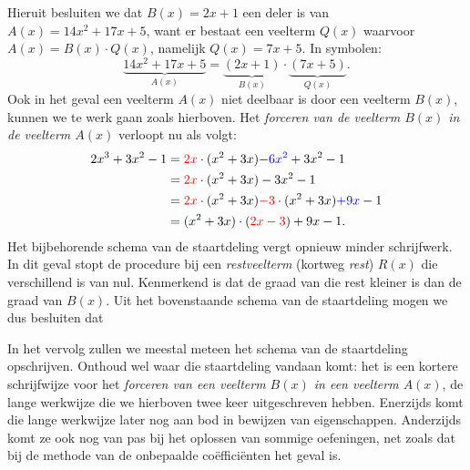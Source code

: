 \documentclass{ximera}
\begin{document}
\begin{werkwijze}
  

Hieruit besluiten we dat $B(x) = 2x+1$ een deler is van $A(x) = 14x^2+17x+5$, want er bestaat een veelterm $Q(x)$ waarvoor $A(x) = B(x) \cdot Q(x)$, namelijk $Q(x) = 7x+5$. In symbolen:
\[
\underbrace{14x^2+17x+5}_{A(x)} = \underbrace{(2x+1)}_{B(x)}\cdot\underbrace{(7x + 5)}_{Q(x)}.
\]
Ook in het geval een veelterm $A(x)$ niet deelbaar is door een veelterm $B(x)$, kunnen we te werk gaan zoals hierboven. Het {\em forceren van de veelterm $B(x)$ in de veelterm $A(x)$} verloopt nu als volgt:
\begin{align*}
2x^3 + 3x^2 - 1 
& = {\color{red}2x} \cdot (x^2+3x) {\color{blue}- 6x^2} + 3x^2 - 1 \\
& = {\color{red}2x} \cdot (x^2+3x) - 3x^2 - 1 \\
& = {\color{red}2x} \cdot (x^2+3x) {\color{red}- 3} \cdot (x^2+3x) {\color{blue}+ 9x} - 1  \\
& = (x^2+3x) \cdot ({\color{red}2x - 3}) + 9x - 1.
\end{align*}
Het bijbehorende schema van de staartdeling vergt opnieuw minder schrijfwerk. 
In dit geval stopt de procedure bij een {\em restveelterm} (kortweg {\em rest}) $R(x)$ die verschillend is van nul. Kenmerkend is dat de graad van die rest kleiner is dan de graad van $B(x)$. Uit het bovenstaande schema van de staartdeling mogen we dus besluiten dat
\end{werkwijze}

In het vervolg zullen we meestal meteen het schema van de staartdeling opschrijven. Onthoud wel waar die staartdeling vandaan komt: het is een kortere schrijfwijze voor het {\em forceren van een veelterm $B(x)$ in een veelterm $A(x)$}, de lange werkwijze die we hierboven twee keer uitgeschreven hebben. Enerzijds komt die lange werkwijze later nog aan bod in bewijzen van eigenschappen. Anderzijds komt ze ook nog van pas bij het oplossen van sommige oefeningen, net zoals dat bij de methode van de onbepaalde co\"effici\"enten het geval is.
\end{document}
